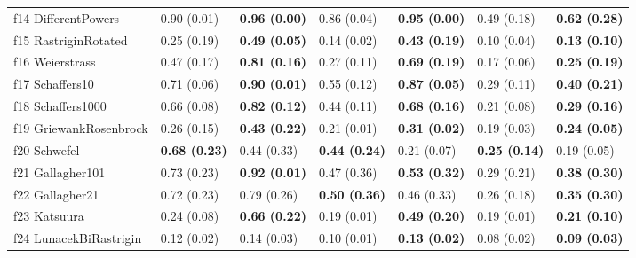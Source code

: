 \begin{table}
\begin{tabular}{lllllll}
f14 DifferentPowers & 0.90 (0.01) & \textbf{0.96 (0.00)} & 0.86 (0.04) & \textbf{0.95 (0.00)} & 0.49 (0.18) & \textbf{0.62 (0.28)} \\
f15 RastriginRotated & 0.25 (0.19) & \textbf{0.49 (0.05)} & 0.14 (0.02) & \textbf{0.43 (0.19)} & 0.10 (0.04) & \textbf{0.13 (0.10)} \\
f16 Weierstrass & 0.47 (0.17) & \textbf{0.81 (0.16)} & 0.27 (0.11) & \textbf{0.69 (0.19)} & 0.17 (0.06) & \textbf{0.25 (0.19)} \\
f17 Schaffers10 & 0.71 (0.06) & \textbf{0.90 (0.01)} & 0.55 (0.12) & \textbf{0.87 (0.05)} & 0.29 (0.11) & \textbf{0.40 (0.21)} \\
f18 Schaffers1000 & 0.66 (0.08) & \textbf{0.82 (0.12)} & 0.44 (0.11) & \textbf{0.68 (0.16)} & 0.21 (0.08) & \textbf{0.29 (0.16)} \\
f19 GriewankRosenbrock & 0.26 (0.15) & \textbf{0.43 (0.22)} & 0.21 (0.01) & \textbf{0.31 (0.02)} & 0.19 (0.03) & \textbf{0.24 (0.05)} \\
f20 Schwefel & \textbf{0.68 (0.23)} & 0.44 (0.33) & \textbf{0.44 (0.24)} & 0.21 (0.07) & \textbf{0.25 (0.14)} & 0.19 (0.05) \\
f21 Gallagher101 & 0.73 (0.23) & \textbf{0.92 (0.01)} & 0.47 (0.36) & \textbf{0.53 (0.32)} & 0.29 (0.21) & \textbf{0.38 (0.30)} \\
f22 Gallagher21 & 0.72 (0.23) & 0.79 (0.26) & \textbf{0.50 (0.36)} & 0.46 (0.33) & 0.26 (0.18) & \textbf{0.35 (0.30)} \\
f23 Katsuura & 0.24 (0.08) & \textbf{0.66 (0.22)} & 0.19 (0.01) & \textbf{0.49 (0.20)} & 0.19 (0.01) & \textbf{0.21 (0.10)} \\
f24 LunacekBiRastrigin & 0.12 (0.02) & 0.14 (0.03) & 0.10 (0.01) & \textbf{0.13 (0.02)} & 0.08 (0.02) & \textbf{0.09 (0.03)} \\
\bottomrule
\end{tabular}
\end{table}
